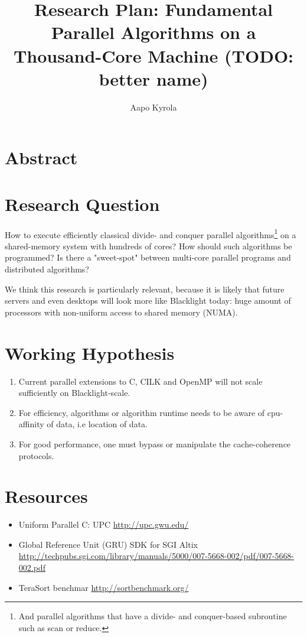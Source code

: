 \documentclass[12pt]{article}
\title{ Research Plan:  Fundamental Parallel Algorithms  on  a Thousand-Core Machine (TODO: better name)}
\author{Aapo Kyrola}
\begin{document}
 
 \maketitle

\section{Abstract}

\section{Research Question}

How to execute efficiently classical divide- and conquer parallel algorithms\footnote{And parallel algorithms
that have a divide- and conquer-based subroutine such as scan or reduce.} on a shared-memory system with
hundreds of cores? How should such algorithms be programmed? Is there a "sweet-spot" between multi-core
parallel programs and distributed algorithms?



We think this research is particularly relevant, because it is likely that future servers and even desktops will look more like
Blacklight today:  huge amount of processors with non-uniform access to shared memory (NUMA).

\section{Working Hypothesis}

\begin{enumerate}

\item Current parallel extensions to C, CILK and OpenMP will not scale sufficiently on Blacklight-scale.

\item For efficiency, algorithms or algorithm runtime needs to be aware of cpu-affinity of data, i.e location of data.

\item For good performance, one must bypass or manipulate the cache-coherence protocols.

\end{enumerate}

\section{Resources}

\begin{itemize} 
\item Uniform Parallel C: UPC  \url{http://upc.gwu.edu/}
\item Global Reference Unit  (GRU) SDK for SGI Altix \url{http://techpubs.sgi.com/library/manuals/5000/007-5668-002/pdf/007-5668-002.pdf}
\item TeraSort benchmar \url{http://sortbenchmark.org/}
\end{itemize}
\end{document}
